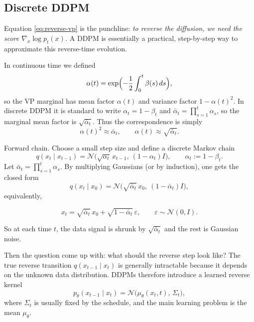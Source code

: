 \documentclass[../main]{subfiles}
\begin{document}
\subsection{Discrete DDPM}
Equation \eqref{eq:reverse-vp} is the punchline: \emph{to reverse the diffusion, we need the score
$\nabla_x\log p_t(x)$.}  A DDPM is essentially a practical, step-by-step way to approximate this
reverse-time evolution.
\begin{remark}
    In continuous time we defined
    \begin{equation}
        \alpha(t)=\exp\Bigl(-\frac12\int_0^t\beta(s)\,ds\Bigr),
    \end{equation}
    so the VP marginal has mean factor $\alpha(t)$ and variance factor $1-\alpha(t)^2$.
    In discrete DDPM it is standard to write $\alpha_t=1-\beta_t$ and
    $\bar\alpha_t=\prod_{s=1}^t\alpha_s$, so the marginal mean factor is $\sqrt{\bar\alpha_t}$.
    Thus the correspondence is simply
    \begin{equation}
        \alpha(t)^2 \approx \bar\alpha_t,
        \qquad
        \alpha(t)\approx \sqrt{\bar\alpha_t}.
    \end{equation}
    \end{remark}
{Forward chain.} Choose a small step size and define a discrete Markov chain
\begin{equation}\label{eq:ddpm-forward-rewrite}
    q(x_t\mid x_{t-1})
    =\mathcal N\!\bigl(\sqrt{\alpha_t}\,x_{t-1},\ (1-\alpha_t)I\bigr),
    \qquad \alpha_t:=1-\beta_t.
\end{equation}
Let $\bar\alpha_t=\prod_{s=1}^t\alpha_s$. By multiplying Gaussians (or by induction), one gets the
closed form
\begin{equation}\label{eq:ddpm-marginal-rewrite}
    q(x_t\mid x_0)
    =\mathcal N\!\bigl(\sqrt{\bar\alpha_t}\,x_0,\ (1-\bar\alpha_t)I\bigr),
\end{equation}
equivalently,
\begin{theorem}
    \begin{equation}\label{eq:xt-eps}
        x_t=\sqrt{\bar\alpha_t}\,x_0+\sqrt{1-\bar\alpha_t}\,\varepsilon,\qquad \varepsilon\sim\mathcal N(0,I).
    \end{equation}
\end{theorem}

So at each time $t$, the data signal is shrunk by $\sqrt{\bar\alpha_t}$ and the rest is Gaussian noise.

Then the question come up with: {what should the reverse step look like?}
The true reverse transition $q(x_{t-1}\mid x_t)$ is generally intractable because it depends on the
unknown data distribution. DDPMs therefore introduce a learned reverse kernel
\begin{equation}\label{eq:ddpm-reverse-kernel}
    p_\theta(x_{t-1}\mid x_t)=\mathcal N\!\bigl(\mu_\theta(x_t,t),\,\Sigma_t\bigr),
\end{equation}
where $\Sigma_t$ is usually fixed by the schedule, and the main learning problem is the mean
$\mu_\theta$.
\end{document}
